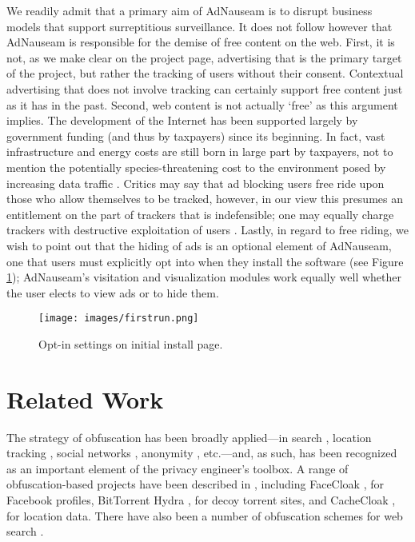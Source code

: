 \documentclass[conference]{IEEEtran}
\begin{document}
We readily admit that a primary aim of AdNauseam is to disrupt business models that support surreptitious surveillance. It does not follow however that AdNauseam is responsible for the demise of free content on the web. First, it is not, as we make clear on the project page, advertising that is the primary target of the project, but rather the tracking of users without their consent. Contextual advertising that does not involve tracking can certainly support free content just as it has in the past. Second, web content is not actually ‘free’ as this argument implies. The development of the Internet has been supported largely by government funding (and thus by taxpayers) since its beginning. In fact, vast infrastructure and energy costs are still born in large part by taxpayers, not to mention the potentially species-threatening cost to the environment posed by increasing data traffic \cite{Hazas}. Critics may say that ad blocking users free ride upon those who allow themselves to be tracked, however, in our view this presumes an entitlement on the part of trackers that is indefensible; one may equally charge trackers with destructive exploitation of users \cite{Brunton}. Lastly, in regard to free riding, we wish to point out that the hiding of ads is an optional element of AdNauseam, one that users must explicitly opt into when they install the software (see Figure \ref{fig:firstrun}); AdNauseam's visitation and visualization modules work equally well whether the user elects to view ads or to hide them.

\begin{figure}[!t]
\centering
\texttt{[image: images/firstrun.png]}
\caption{Opt-in settings on initial install page.}
\label{fig:firstrun}
\end{figure}

\section{Related Work}

The strategy of obfuscation has been broadly applied---in search \cite{Howe-1}, location tracking \cite{Meyerowitz}, social networks \cite{Luo}, anonymity \cite{Chakravarty, Schulze}, etc.---and, as such, has been recognized as an important element of the privacy engineer's toolbox. A range of obfuscation-based projects have been described in \cite{Brunton}, including FaceCloak \cite{Luo}, for Facebook profiles, BitTorrent Hydra \cite{Schulze}, for decoy torrent sites, and CacheCloak \cite{Meyerowitz}, for location data. There have also been a number of obfuscation schemes for web search \cite{Gervais}.
\end{document}
